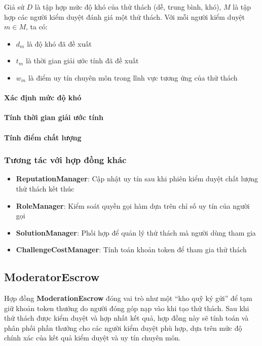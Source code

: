 Giả sử $D$ là tập hợp mức độ khó của thử thách (dễ, trung bình, khó), $M$ là tập hợp các người kiểm duyệt đánh giá một thử thách. Với mỗi người kiểm duyệt $m \in M$, ta có:
\begin{itemize}
  \item $d_m$ là độ khó đã đề xuất
  \item $t_m$ là thời gian giải ước tính đã đề xuất
  \item $w_m$ là điểm uy tín chuyên môn trong lĩnh vực tương ứng của thử thách
\end{itemize}

\paragraph{Xác định mức độ khó}

\paragraph{Tính thời gian giải ước tính}

\paragraph{Tính điểm chất lượng}

\subsubsection{Tương tác với hợp đồng khác}

\begin{itemize}
  \item \textbf{ReputationManager}: Cập nhật uy tín sau khi phiên kiểm duyệt chất lượng thử thách kết thúc
  \item \textbf{RoleManager}: Kiểm soát quyền gọi hàm dựa trên chỉ số uy tín của người gọi
  \item \textbf{SolutionManager}: Phối hợp để quản lý thử thách mà người dùng tham gia
  \item \textbf{ChallengeCostManager}: Tính toán khoản token để tham gia thử thách
\end{itemize}

\subsection{ModeratorEscrow}

Hợp đồng \textbf{ModerationEscrow} đóng vai trò như một ``kho quỹ ký gửi'' để tạm giữ khoản token thưởng do người đóng góp nạp vào khi tạo thử thách.
Sau khi thử thách được kiểm duyệt và hợp nhất kết quả, hợp đồng này sẽ tính toán và phân phối phần thưởng cho các người kiểm duyệt phù hợp, dựa trên mức độ chính xác của kết quả kiểm duyệt và uy tín chuyên môn.

